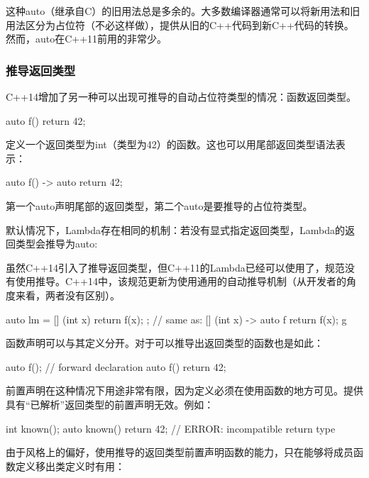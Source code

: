 这种auto（继承自C）的旧用法总是多余的。大多数编译器通常可以将新用法和旧用法区分为占位符（不必这样做），提供从旧的C++代码到新C++代码的转换。然而，auto在C++11前用的非常少。

\subsubsection{推导返回类型}

C++14增加了另一种可以出现可推导的自动占位符类型的情况：函数返回类型。

\begin{cpp}
auto f() { return 42; }
\end{cpp}

定义一个返回类型为int（类型为42）的函数。这也可以用尾部返回类型语法表示：

\begin{cpp}
auto f() -> auto { return 42; }
\end{cpp}

第一个auto声明尾部的返回类型，第二个auto是要推导的占位符类型。

默认情况下，Lambda存在相同的机制：若没有显式指定返回类型，Lambda的返回类型会推导为auto:

\begin{notice}
虽然C++14引入了推导返回类型，但C++11的Lambda已经可以使用了，规范没有使用推导。C++14中，该规范更新为使用通用的自动推导机制（从开发者的角度来看，两者没有区别）。
\end{notice}

\begin{cpp}
auto lm = [] (int x) { return f(x); };
// same as: [] (int x) -> auto f return f(x); g
\end{cpp}

函数声明可以与其定义分开。对于可以推导出返回类型的函数也是如此：

\begin{cpp}
auto f(); // forward declaration
auto f() { return 42; }
\end{cpp}

前置声明在这种情况下用途非常有限，因为定义必须在使用函数的地方可见。提供具有“已解析”返回类型的前置声明无效。例如：

\begin{cpp}
int known();
auto known() { return 42; } // ERROR: incompatible return type
\end{cpp}

由于风格上的偏好，使用推导的返回类型前置声明函数的能力，只在能够将成员函数定义移出类定义时有用：

